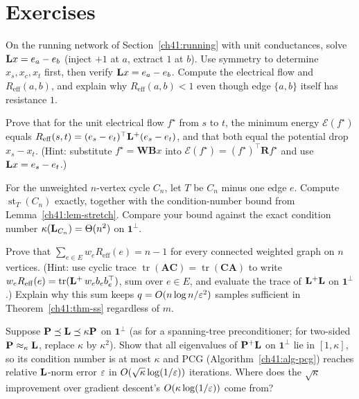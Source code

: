 \section*{Exercises}

\begin{exercise}
On the running network of Section~\ref{ch41:running} with unit conductances, solve $\mathbf{L} x = e_a - e_b$ (inject $+1$ at $a$, extract $1$ at $b$). Use symmetry to determine $x_s,x_c,x_t$ first, then verify $\mathbf{L} x = e_a - e_b$. Compute the electrical flow and $R_{\mathrm{eff}}(a,b)$, and explain why $R_{\mathrm{eff}}(a,b)<1$ even though edge $\{a,b\}$ itself has resistance $1$.
\end{exercise}

\begin{exercise}
Prove that for the unit electrical flow $f^\star$ from $s$ to $t$, the minimum energy $\mathcal{E}(f^\star)$ equals $R_{\mathrm{eff}}(s,t)=(e_s-e_t)^\top\mathbf{L}^{+}(e_s-e_t)$, and that both equal the potential drop $x_s-x_t$. (Hint: substitute $f^\star=\mathbf{W}\mathbf{B}x$ into $\mathcal{E}(f^\star) = (f^\star)^\top \mathbf{R} f^\star$ and use $\mathbf{L} x = e_s-e_t$.)
\end{exercise}

\begin{exercise}
For the unweighted $n$-vertex cycle $C_n$, let $T$ be $C_n$ minus one edge $e$. Compute $\operatorname{st}_T(C_n)$ exactly, together with the condition-number bound from Lemma~\ref{ch41:lem-stretch}. Compare your bound against the exact condition number $\kappa(\mathbf{L}_{C_n})=\Theta(n^2)$ on $\mathbf{1}^\perp$.
\end{exercise}

\begin{exercise}
Prove that $\sum_{e \in E} w_e R_{\mathrm{eff}}(e) = n-1$ for every connected weighted graph on $n$ vertices. (Hint: use cyclic trace $\operatorname{tr}(\mathbf{A}\mathbf{C}) = \operatorname{tr}(\mathbf{C}\mathbf{A})$ to write $w_e R_{\mathrm{eff}}(e)=\operatorname{tr}(\mathbf{L}^{+}\,w_e b_e b_e^\top)$, sum over $e \in E$, and evaluate the trace of $\mathbf{L}^{+}\mathbf{L}$ on $\mathbf{1}^\perp$.) Explain why this sum keeps $q = O(n\log n/\varepsilon^2)$ samples sufficient in Theorem~\ref{ch41:thm-ss} regardless of $m$.
\end{exercise}

\begin{exercise}
Suppose $\mathbf{P}\preceq\mathbf{L}\preceq\kappa\mathbf{P}$ on $\mathbf{1}^\perp$ (as for a spanning-tree preconditioner; for two-sided $\mathbf{P}\approx_\kappa\mathbf{L}$, replace $\kappa$ by $\kappa^2$). Show that all eigenvalues of $\mathbf{P}^{+}\mathbf{L}$ on $\mathbf{1}^\perp$ lie in $[1,\kappa]$, so its condition number is at most $\kappa$ and PCG (Algorithm~\ref{ch41:alg-pcg}) reaches relative $\mathbf{L}$-norm error $\varepsilon$ in $O(\sqrt\kappa\log(1/\varepsilon))$ iterations. Where does the $\sqrt\kappa$ improvement over gradient descent's $O(\kappa\log(1/\varepsilon))$ come from?
\end{exercise}

